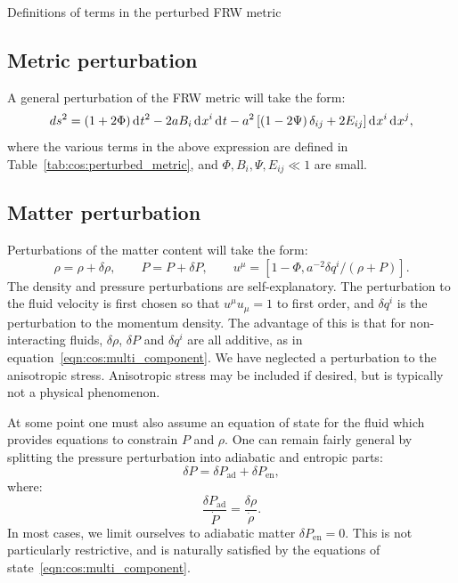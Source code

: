 \begin{table}
  \centering
  
  \caption{Definitions of terms in the perturbed FRW metric}\label{tab:cos:perturbed_metric}
\end{table}


\subsection{Metric perturbation}
A general perturbation of the FRW metric will take the form:
\begin{equation}
  ds^2 = (1+2\Phi)\operatorname{d}^{}\!{t}^2 -2a B_i \operatorname{d}^{}\!{x}^i \operatorname{d}^{}\!{t}  -a^2 \left[ \left( 1 - 2 \Psi \right)\delta_{ij} + 2E_{ij} \right] \operatorname{d}^{}\!{x}^i \operatorname{d}^{}\!{x}^j,
  \label{eqn:cos:FRW_perturb}
\end{equation}
where the various terms in the above expression are defined in Table~\ref{tab:cos:perturbed_metric}, and ${\Phi,B_i,\Psi,E_{ij}\ll1}$ are small. 

\subsection{Matter perturbation}
Perturbations of the matter content will take the form:
\begin{equation}
  \rho = \rho + \delta \rho, \qquad 
  P = P + \delta P, \qquad
  u^\mu = \left[ 1-\Phi, a^{-2} \delta q^i/(\rho+P)\right].
  \label{eqn:cos:matter_perturb}
\end{equation}
The density and pressure perturbations are self-explanatory. The perturbation to the fluid velocity is first chosen so that $u^\mu u_\mu=1$ to first order, and $\delta q^i$ is the perturbation to the momentum density. The advantage of this is that for non-interacting fluids, $\delta\rho$, $\delta P$ and $\delta q^i$ are all additive, as in equation~\eqref{eqn:cos:multi_component}. We have neglected a perturbation to the anisotropic stress. Anisotropic stress may be included if desired, but is typically not a physical phenomenon. 

At some point one must also assume an equation of state for the fluid which provides equations to constrain $P$ and $\rho$. One can remain fairly general by splitting the pressure perturbation into adiabatic and entropic parts:
\begin{equation}
  \delta P = \delta P_\mathrm{ad} + \delta P_\mathrm{en},
  \label{eqn:cos:adiabatic_entropic}
\end{equation} 
where:
\begin{equation}
  \frac{\delta P_\mathrm{ad}}{\dot{P}} = \frac{\delta\rho}{\dot{\rho}}.
  \label{eqn:cos:adiabatic}
\end{equation} 
In most cases, we limit ourselves to adiabatic matter $\delta P_\mathrm{en}=0$.
This is not particularly restrictive, and is naturally satisfied by the equations of state~\eqref{eqn:cos:multi_component}.

